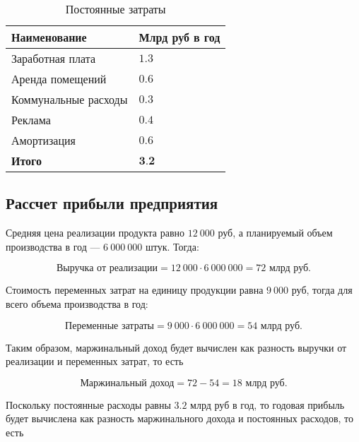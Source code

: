 \begin{center}
    \captionsetup{justification=raggedright,singlelinecheck=off}
    \begin{longtable}[c]{|P{6cm}|P{7cm}|}
    \caption{Постоянные затраты\label{tbl:const}}
    \\ \hline
        \textbf{Наименование} & \textbf{Млрд руб в год}
    \\ \hline
        Заработная плата & $1.3$
    \\ \hline
        Аренда помещений & $0.6$
    \\ \hline
        Коммунальные расходы & $0.3$
    \\ \hline
        Реклама & $0.4$
    \\ \hline
        Амортизация & $0.6$
    \\ \hline
        \textbf{Итого} & $\textbf{3.2}$
    \\ \hline
\end{longtable}
\end{center}


\subsection{Рассчет прибыли предприятия}

Средняя цена реализации продукта равно $12\ 000$ руб, а планируемый объем производства в год --- $6\ 000\ 000$ штук. Тогда:

\begin{equation}
    \textbf{Выручка от реализации} = 12\ 000 \cdot 6\ 000\ 000 = 72 \text{ млрд руб.}
\end{equation}

Стоимость переменных затрат на единицу продукции равна $9\ 000$ руб, тогда для всего объема производства в год:

\begin{equation}
    \textbf{Переменные затраты} = 9\ 000 \cdot 6\ 000\ 000 = 54 \text{ млрд руб.}
\end{equation}

Таким образом, маржинальный доход будет вычислен как разность выручки от реализации и переменных затрат, то есть

\begin{equation}
    \textbf{Маржинальный доход} = 72 - 54 = 18 \text{ млрд руб.}
\end{equation}

Поскольку постоянные расходы равны $3.2$ млрд руб в год, то годовая прибыль будет вычислена как разность маржинального дохода и постоянных расходов, то есть

